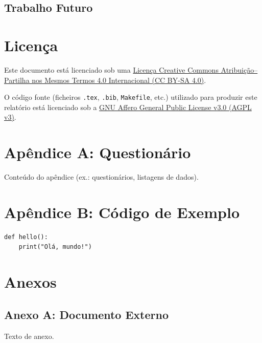 \documentclass[12pt,a4paper,openright,oneside]{memoir}
\begin{document}
\section{Trabalho Futuro}






\clearpage
\printbibliography[title={Referências Bibliográficas}]

\clearpage
\chapter*{Licença}
\noindent
Este documento está licenciado sob uma
\href{https://creativecommons.org/licenses/by-sa/4.0/}{Licença Creative Commons Atribuição–Partilha nos Mesmos Termos 4.0 Internacional (CC BY-SA 4.0)}.

\vspace{0.5cm}
O código fonte (ficheiros \texttt{.tex}, \texttt{.bib}, \texttt{Makefile}, etc.) utilizado para produzir este relatório está licenciado sob a
\href{https://www.gnu.org/licenses/agpl-3.0.html}{GNU Affero General Public License v3.0 (AGPL v3)}.

\clearpage
\appendix
\chapter{Apêndice A: Questionário}
\label{app:questionario}
Conteúdo do apêndice (ex.: questionários, listagens de dados).

\chapter{Apêndice B: Código de Exemplo}
\label{app:code}
\begin{verbatim}
def hello():
    print("Olá, mundo!")
\end{verbatim}

\backmatter
\chapter*{Anexos}
\section*{Anexo A: Documento Externo}
Texto de anexo.
\end{document}
